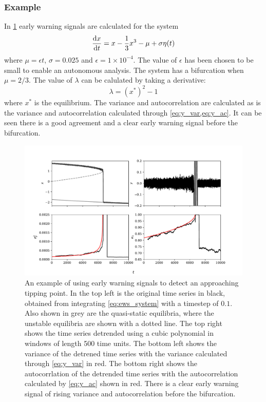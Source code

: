 \subsubsection{Example}
In \cref{fig:ews} early warning signals are calculated for the system
\begin{equation}
  \label{eq:ews_system}
  \dv{x}{t} = x - \frac{1}{3}x^3 - \mu + \sigma \eta(t)
\end{equation}
where $\mu = \epsilon t$, $\sigma = 0.025$ and $\epsilon = 1\times 10^{-4}$. The value of $\epsilon$ has been chosen to be small to enable an autonomous analysis. The system has a bifurcation when $\mu = 2/3$.
The value of $\lambda$ can be calulated by taking a derivative:
\begin{equation}
  \label{eq:ews_lambda}
  \lambda = \left(x^*\right)^2 - 1 
\end{equation}
where $x^*$ is the equilibrium. The variance and autocorrelation are calculated as is the variance and autocorrelation calculated through \cref{eq:y_var,eq:y_ac}. It can be seen there is a
good agreement and a clear early warning signal before the bifurcation.
\begin{figure}
  \centering
  \includegraphics[width=\textwidth,keepaspectratio]{ews}
  \caption[An example of an early warning signal]{An example of using early warning signals to detect an approaching tipping point. In the top left is the original time series in black, obtained
    from integrating \cref{eq:ews_system} with a timestep of $0.1$. Also shown in grey are the quasi-static equilibria, where the unstable equilibria are shown with a dotted line.
    The top right shows the time series detrended using a cubic polynomial in windows of length 500 time units.
    The bottom left shows the variance of the detrened time series with the variance calculated through \cref{eq:y_var} in red. The bottom right shows the autocorrlation of the detrended time series
    with the autocorrelation calculated by \cref{eq:y_ac} shown in red. There is a clear early warning signal of rising variance and autocorrelation before the bifurcation.}
  \label{fig:ews}
\end{figure}

